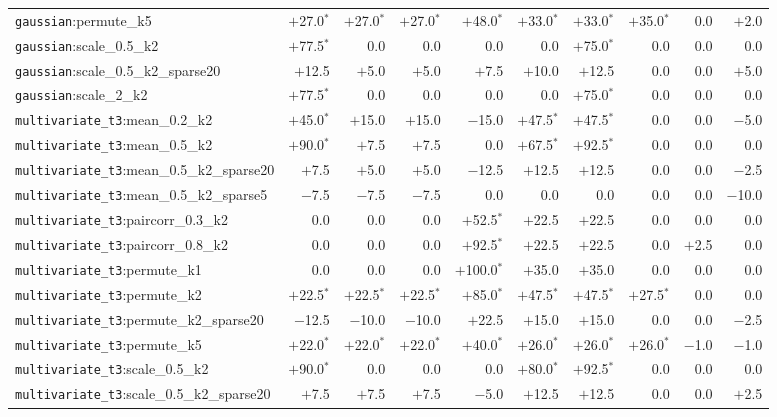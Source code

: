 \begin{table}[!tp]
\begin{tabular*}{\textwidth}{@{\extracolsep{\fill}}lrrrrrrrrr}
\texttt{gaussian}:permute\_k5 & $+$27.0$^{*}$ & $+$27.0$^{*}$ & $+$27.0$^{*}$ & $+$48.0$^{*}$ & $+$33.0$^{*}$ & $+$33.0$^{*}$ & $+$35.0$^{*}$ & 0.0 & $+$2.0 \\
\texttt{gaussian}:scale\_0.5\_k2 & $+$77.5$^{*}$ & 0.0 & 0.0 & 0.0 & 0.0 & $+$75.0$^{*}$ & 0.0 & 0.0 & 0.0 \\
\texttt{gaussian}:scale\_0.5\_k2\_sparse20 & $+$12.5 & $+$5.0 & $+$5.0 & $+$7.5 & $+$10.0 & $+$12.5 & 0.0 & 0.0 & $+$5.0 \\
\texttt{gaussian}:scale\_2\_k2 & $+$77.5$^{*}$ & 0.0 & 0.0 & 0.0 & 0.0 & $+$75.0$^{*}$ & 0.0 & 0.0 & 0.0 \\
\midrule
\texttt{multivariate\_t3}:mean\_0.2\_k2 & $+$45.0$^{*}$ & $+$15.0 & $+$15.0 & $-$15.0 & $+$47.5$^{*}$ & $+$47.5$^{*}$ & 0.0 & 0.0 & $-$5.0 \\
\texttt{multivariate\_t3}:mean\_0.5\_k2 & $+$90.0$^{*}$ & $+$7.5 & $+$7.5 & 0.0 & $+$67.5$^{*}$ & $+$92.5$^{*}$ & 0.0 & 0.0 & 0.0 \\
\texttt{multivariate\_t3}:mean\_0.5\_k2\_sparse20 & $+$7.5 & $+$5.0 & $+$5.0 & $-$12.5 & $+$12.5 & $+$12.5 & 0.0 & 0.0 & $-$2.5 \\
\texttt{multivariate\_t3}:mean\_0.5\_k2\_sparse5 & $-$7.5 & $-$7.5 & $-$7.5 & 0.0 & 0.0 & 0.0 & 0.0 & 0.0 & $-$10.0 \\
\texttt{multivariate\_t3}:paircorr\_0.3\_k2 & 0.0 & 0.0 & 0.0 & $+$52.5$^{*}$ & $+$22.5 & $+$22.5 & 0.0 & 0.0 & 0.0 \\
\texttt{multivariate\_t3}:paircorr\_0.8\_k2 & 0.0 & 0.0 & 0.0 & $+$92.5$^{*}$ & $+$22.5 & $+$22.5 & 0.0 & $+$2.5 & 0.0 \\
\texttt{multivariate\_t3}:permute\_k1 & 0.0 & 0.0 & 0.0 & $+$100.0$^{*}$ & $+$35.0 & $+$35.0 & 0.0 & 0.0 & 0.0 \\
\texttt{multivariate\_t3}:permute\_k2 & $+$22.5$^{*}$ & $+$22.5$^{*}$ & $+$22.5$^{*}$ & $+$85.0$^{*}$ & $+$47.5$^{*}$ & $+$47.5$^{*}$ & $+$27.5$^{*}$ & 0.0 & 0.0 \\
\texttt{multivariate\_t3}:permute\_k2\_sparse20 & $-$12.5 & $-$10.0 & $-$10.0 & $+$22.5 & $+$15.0 & $+$15.0 & 0.0 & 0.0 & $-$2.5 \\
\texttt{multivariate\_t3}:permute\_k5 & $+$22.0$^{*}$ & $+$22.0$^{*}$ & $+$22.0$^{*}$ & $+$40.0$^{*}$ & $+$26.0$^{*}$ & $+$26.0$^{*}$ & $+$26.0$^{*}$ & $-$1.0 & $-$1.0 \\
\texttt{multivariate\_t3}:scale\_0.5\_k2 & $+$90.0$^{*}$ & 0.0 & 0.0 & 0.0 & $+$80.0$^{*}$ & $+$92.5$^{*}$ & 0.0 & 0.0 & 0.0 \\
\texttt{multivariate\_t3}:scale\_0.5\_k2\_sparse20 & $+$7.5 & $+$7.5 & $+$7.5 & $-$5.0 & $+$12.5 & $+$12.5 & 0.0 & 0.0 & $+$2.5 \\

\end{tabular*}
\end{table}
